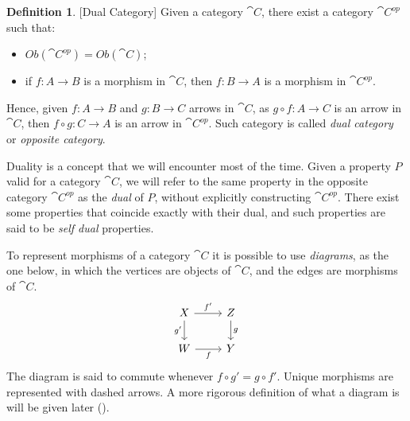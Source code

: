 \documentclass[a4paper, twoside,openright]{report}
\theoremstyle{plain}
\theoremstyle{definition}
\newtheorem{definition}[theorem]{Definition}
\begin{document}
\begin{definition}\label{def:dual_cat}[Dual Category]
    Given a category $\cat C$, there exist a category $\cat C^{op}$ such that:
    \begin{itemize}
        \item $Ob(\cat C^{op}) = Ob(\cat C)$;
        \item if $f: A \rightarrow B$ is a morphism in $\cat C$, then $f: B\rightarrow A$ is a morphism in $\cat C ^ {op}$.
    \end{itemize}
    Hence, given $f : A \rightarrow B$ and $g: B \rightarrow C$ arrows in $\cat C$, as $g \circ f: A \rightarrow C$ is an arrow in $\cat C$, then $f \circ g: C \rightarrow A$ is an arrow in $\cat C ^{op}$.
    Such category is called \emph{dual category} or \emph{opposite category}.
\end{definition}

Duality is a concept that we will encounter most of the time. Given a property $P$ valid for a category $\cat C$, we will refer to the same property in the opposite category $\cat C^{op}$ as the \emph{dual} of $P$, without explicitly constructing $\cat C^{op}$. There exist some properties that coincide exactly with their dual, and such properties are said to be \emph{self dual} properties.


To represent morphisms of a category $\cat{C}$ it is possible to use \emph{diagrams}, as the one below, in which the vertices are objects of $\cat{C}$, and the edges are morphisms of $\cat{C}$.
    \[
    \begin{tikzcd}
        X \arrow[d, "g'" swap] \arrow[r, "f'"] & Z \arrow[d, "g"] \\
        W \arrow[r, "f" swap] & Y        
    \end{tikzcd}
    \]
The diagram is said to commute whenever  $f \circ g' = g \circ f'$. Unique morphisms are represented with dashed arrows.
A more rigorous definition of what a diagram is will be given later ().
\end{document}

